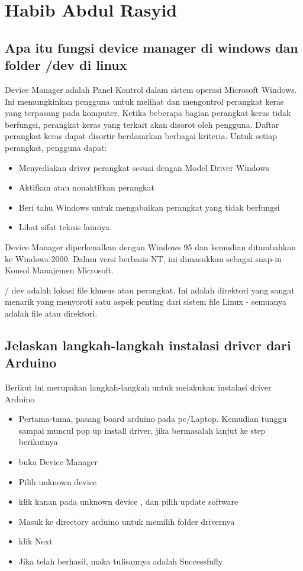 \section{Habib Abdul Rasyid}
\subsection{ Apa itu fungsi device manager di windows dan folder /dev di linux}
Device Manager adalah Panel Kontrol dalam sistem operasi Microsoft Windows. Ini memungkinkan pengguna untuk melihat dan mengontrol perangkat keras yang terpasang pada komputer. Ketika beberapa bagian perangkat keras tidak berfungsi, perangkat keras yang terkait akan disorot oleh pengguna. Daftar perangkat keras dapat disortir berdasarkan berbagai kriteria.
Untuk setiap perangkat, pengguna dapat:
\begin{itemize}
     \item Menyediakan driver perangkat sesuai dengan Model Driver Windows
     \item Aktifkan atau nonaktifkan perangkat
     \item Beri tahu Windows untuk mengabaikan perangkat yang tidak berfungsi
     \item Lihat sifat teknis lainnya
\end{itemize}
Device Manager diperkenalkan dengan Windows 95 dan kemudian ditambahkan ke Windows 2000. Dalam versi berbasis NT, ini dimasukkan sebagai snap-in Konsol Manajemen Microsoft.\newline

/ dev adalah lokasi file khusus atau perangkat. Ini adalah direktori yang sangat menarik yang menyoroti satu aspek penting dari sistem file Linux - semuanya adalah file atau direktori.


\subsection{Jelaskan langkah-langkah instalasi driver dari Arduino}
Berikut ini merupakan langkah-langkah untuk melakukan instalasi driver Arduino
\begin{itemize}
	\item Pertama-tama, pasang board arduino pada pc/Laptop. Kemudian tunggu sampai muncul pop up install driver, jika bermasalah lanjut ke step berikutnya
	\item buka Device Manager 
	\item Pilih unknown device
	\item klik kanan pada unknown device , dan pilih update software
	\item Masuk ke directory arduino untuk memilih folder drivernya
	\item klik Next
	\item Jika telah berhasil, maka tulisannya adalah Successfully
\end{itemize}

